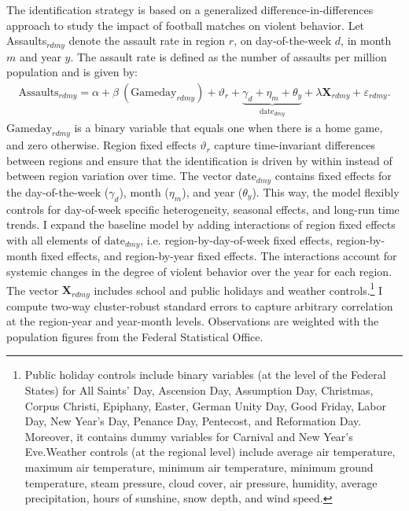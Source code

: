 The identification strategy is based on a generalized difference-in-differences approach to study the impact of football matches on violent behavior. Let Assaults$_{rdmy}$ denote the assault rate in region $r$, on day-of-the-week $d$, in month $m$ and year $y$. The assault rate is defined as the number of assaults per million population and is given by:
\begin{align}
\text{Assaults}_{rdmy} = \alpha + \beta\ (\text{Gameday}_{rdmy}) + \vartheta_r + \underbrace{\gamma_d + \eta_m + \theta_y}_{\text{date}_{dmy}} + \lambda \mathbf{X}_{rdmy} + \varepsilon_{rdmy}
\label{eq_soc_ext:model}.
\end{align}
$\text{Gameday}_{rdmy}$ is a binary variable that equals one when there is a home game, and zero otherwise. Region fixed effects $\vartheta_r$ capture time-invariant differences between regions and ensure that the identification is driven by within instead of between region variation over time. The vector $\text{date}_{dmy}$ contains fixed effects for the day-of-the-week ($\gamma_d$), month ($\eta_m$), and year ($\theta_y$). This way, the model flexibly controls for day-of-week specific heterogeneity, seasonal effects, and long-run time trends. I expand the baseline model by adding interactions of region fixed effects with all elements of $\text{date}_{dmy}$, i.e. region-by-day-of-week fixed effects, region-by-month fixed effects, and region-by-year fixed effects. The interactions account for systemic changes in the degree of violent behavior over the year for each region. The vector $\mathbf{X}_{rdmy}$ includes school and public holidays and weather controls.\footnote{Public holiday controls include binary variables (at the level of the Federal States) for All Saints' Day, Ascension Day, Assumption Day, Christmas, Corpus Christi, Epiphany, Easter, German Unity Day, Good Friday, Labor Day, New Year's Day, Penance Day, Pentecost, and Reformation Day. Moreover, it contains dummy variables for Carnival and New Year's Eve.\newline Weather controls (at the regional level) include average air temperature, maximum air temperature, minimum air temperature, minimum ground temperature, steam pressure, cloud cover, air pressure, humidity, average precipitation, hours of sunshine, snow depth, and wind speed.} I compute two-way cluster-robust standard errors to capture arbitrary correlation at the region-year and year-month levels. Observations are weighted with the population figures from the Federal Statistical Office.


